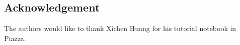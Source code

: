 \documentclass[12pt]{article}
\begin{document}
\subsection*{Acknowledgement}

The authors would like to thank Xichen Huang for his tutorial notebook in Piazza.

\vfill\pagebreak


%

\end{document}
